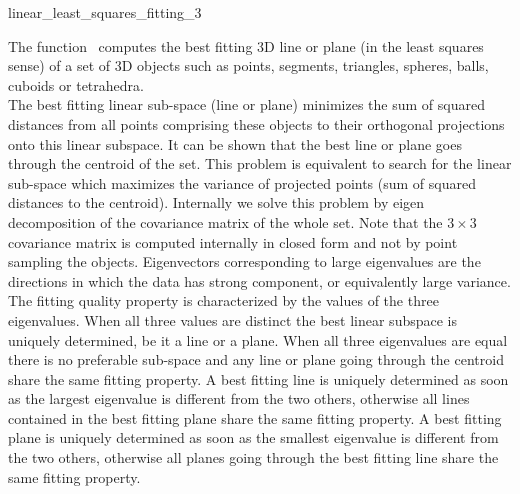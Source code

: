 
\begin{ccRefFunction}{linear_least_squares_fitting_3}  

\ccDefinition
  
The function \ccRefName\ computes the best fitting 3D line or plane (in the least squares sense) of a set of 3D objects such as points, segments, triangles, spheres, balls, cuboids or tetrahedra. \\

The best fitting linear sub-space (line or plane) minimizes the sum of squared distances from all points comprising these objects to their orthogonal projections onto this linear subspace. It can be shown that the best line or plane goes through the centroid of the set. This problem is equivalent to search for the linear sub-space which maximizes the variance of projected points (sum of squared distances to the centroid). Internally we solve this problem by eigen decomposition of the covariance matrix of the whole set. Note that the $3 \times 3$ covariance matrix is computed internally in closed form and not by point sampling the objects. Eigenvectors corresponding to large eigenvalues are the directions in which the data has strong component, or equivalently large variance.\\

The fitting quality property is characterized by the values of the three eigenvalues. When all three values are distinct the best linear subspace is uniquely determined, be it a line or a plane. When all three eigenvalues are equal there is no preferable sub-space and any line or plane going through the centroid share the same fitting property. A best fitting line is uniquely determined as soon as the largest eigenvalue is different from the two others, otherwise all lines contained in the best fitting plane share the same fitting property. A best fitting plane is uniquely determined as soon as the smallest eigenvalue is different from the two others, otherwise all planes going through the best fitting line share the same fitting property.


\end{ccRefFunction}
